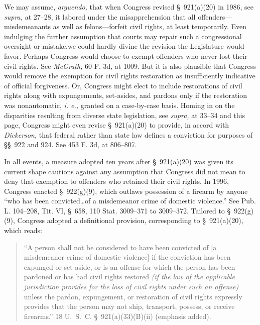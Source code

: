   We may assume, \emph{arguendo,} that when Congress revised \S~921(a)(20) in 1986, see \emph{supra,} at 27--28, it labored under the misapprehension that all offenders---misdemeanants as well as felons---forfeit civil rights, at least temporarily. Even indulging the further assumption that courts may repair such a congressional oversight or mistake,\footnotemark[6] we could hardly divine the revision the Legislature would favor. Perhaps Congress would choose to exempt offenders who never lost their civil rights. See \emph{McGrath,} 60 F. 3d, at 1009. But it is also plausible that Congress would remove the exemption for civil rights restoration as insufficiently indicative of official forgiveness. Or, Congress might elect to include restorations of civil rights along with expungements, set-asides, and pardons only if the restoration was nonautomatic, \emph{i. e.,} granted on a case-by-case basis. Homing in on the disparities resulting from diverse state legislation, see \emph{supra,} at 33--34 and this page, Congress might even revise \S~921(a)(20) to provide, in accord with \emph{Dickerson,} that federal rather than state law defines a conviction for purposes of \S\S~922 and 924. See 453 F. 3d, at 806--807.


  In all events, a measure adopted ten years after \S~921(a)(20) was given its current shape cautions against any assumption that Congress did not mean to deny that exemption to offenders who retained their civil rights. In 1996, Congress enacted \S~922(g)(9), which outlaws possession of a firearm by anyone ``who has been convicted\dots of a misdemeanor crime of domestic violence.'' See Pub. L. 104--208, \newpage  Tit. VI, \S~658, 110 Stat. 3009--371 to 3009--372. Tailored to \S~922(g)(9), Congress adopted a definitional provision, corresponding to \S~921(a)(20), which reads:

\begin{quote}

	``A person shall not be considered to have been convicted of [a misdemeanor crime of domestic violence] if the conviction has been expunged or set aside, or is an offense for which the person has been pardoned or has had civil rights restored \emph{(if the law of the applicable jurisdiction provides for the loss of civil rights under such an offense)} unless the pardon, expungement, or restoration of civil rights expressly provides that the person may not ship, transport, possess, or receive firearms.'' 18 U.~S.~C. \S~921(a)(33)(B)(ii) (emphasis added).

\end{quote}

